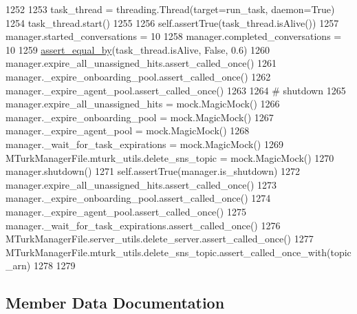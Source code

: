 \begin{DoxyCode}
1252 
1253         task\_thread = threading.Thread(target=run\_task, daemon=\textcolor{keyword}{True})
1254         task\_thread.start()
1255 
1256         self.assertTrue(task\_thread.isAlive())
1257         manager.started\_conversations = 10
1258         manager.completed\_conversations = 10
1259         \hyperlink{namespaceparlai_1_1mturk_1_1core_1_1test_1_1test__mturk__manager_a1fd7ac4fedefa65d2416601107dbe44c}{assert\_equal\_by}(task\_thread.isAlive, \textcolor{keyword}{False}, 0.6)
1260         manager.expire\_all\_unassigned\_hits.assert\_called\_once()
1261         manager.\_expire\_onboarding\_pool.assert\_called\_once()
1262         manager.\_expire\_agent\_pool.assert\_called\_once()
1263 
1264         \textcolor{comment}{# shutdown}
1265         manager.expire\_all\_unassigned\_hits = mock.MagicMock()
1266         manager.\_expire\_onboarding\_pool = mock.MagicMock()
1267         manager.\_expire\_agent\_pool = mock.MagicMock()
1268         manager.\_wait\_for\_task\_expirations = mock.MagicMock()
1269         MTurkManagerFile.mturk\_utils.delete\_sns\_topic = mock.MagicMock()
1270         manager.shutdown()
1271         self.assertTrue(manager.is\_shutdown)
1272         manager.expire\_all\_unassigned\_hits.assert\_called\_once()
1273         manager.\_expire\_onboarding\_pool.assert\_called\_once()
1274         manager.\_expire\_agent\_pool.assert\_called\_once()
1275         manager.\_wait\_for\_task\_expirations.assert\_called\_once()
1276         MTurkManagerFile.server\_utils.delete\_server.assert\_called\_once()
1277         MTurkManagerFile.mturk\_utils.delete\_sns\_topic.assert\_called\_once\_with(topic\_arn)
1278 
1279 
\end{DoxyCode}


\subsection{Member Data Documentation}
\mbox{\label{classparlai_1_1mturk_1_1core_1_1test_1_1test__mturk__manager_1_1TestMTurkManagerLifecycleFunctions_a9ddbd7a32913dcb12f0934cafe636529}} 
